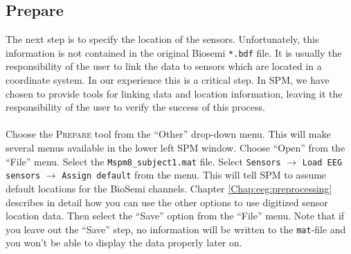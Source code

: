 \subsection{Prepare}
The next step is to specify the location of the sensors. Unfortunately, this information is not contained in the original Biosemi \texttt{*.bdf} file. It is usually the responsibility of the user to link the data to sensors which are located in a coordinate system. In our experience this is a critical step. In SPM, we have chosen to provide tools for linking data and location information, leaving it the responsibility of the user to verify the success of this process.
\\
\\
Choose the \textsc{Prepare} tool from the ``Other'' drop-down menu. This will make several menus available in the lower left SPM window. Choose ``Open'' from the ``File'' menu. Select the \texttt{Mspm8\_subject1.mat} file. Select \texttt{Sensors} $\rightarrow$ \texttt{Load EEG sensors} $\rightarrow$ \texttt{Assign default} from the menu. This will tell SPM to assume default locations for the BioSemi channels. Chapter \ref{Chap:eeg:preprocessing} describes in detail how you can use the other options to use digitized sensor location data. Then select the ``Save'' option from the ``File'' menu. Note that if you leave out the ``Save'' step, no information will be written to the \texttt{mat}-file and you won't be able to display the data properly later on.

